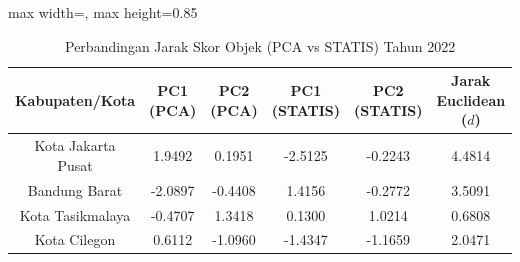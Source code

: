 \begin{table}[H]
\centering
\caption{Perbandingan Jarak Skor Objek (PCA vs STATIS) Tahun 2022} \label{tab:sample1jarak_skor_2022}
\begin{adjustbox}{max width=\textwidth, max height=0.85\textheight}
\begin{tabular}{|c|c|c|c|c|c|}
\hline
\textbf{Kabupaten/Kota} & \textbf{PC1 (PCA)} & \textbf{PC2 (PCA)} & \textbf{PC1 (STATIS)} & \textbf{PC2 (STATIS)} & \textbf{Jarak Euclidean ($d$)} \\
\hline
Kota Jakarta Pusat & 1.9492 & 0.1951 & -2.5125 & -0.2243 & 4.4814 \\
Bandung Barat & -2.0897 & -0.4408 & 1.4156 & -0.2772 & 3.5091 \\
Kota Tasikmalaya & -0.4707 & 1.3418 & 0.1300 & 1.0214 & 0.6808 \\
Kota Cilegon & 0.6112 & -1.0960 & -1.4347 & -1.1659 & 2.0471 \\
\hline
\end{tabular}
\end{adjustbox}
\end{table}